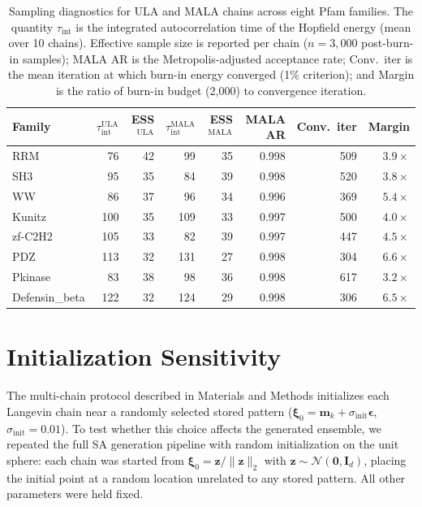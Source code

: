 \begin{table}[ht]
\centering
\caption{Sampling diagnostics for ULA and MALA chains across eight Pfam families. The quantity $\tau_{\mathrm{int}}$ is the integrated autocorrelation time of the Hopfield energy (mean over 10 chains). Effective sample size is reported per chain ($n{=}3{,}000$ post-burn-in samples); MALA AR is the Metropolis-adjusted acceptance rate; Conv.\ iter is the mean iteration at which burn-in energy converged (1\% criterion); and Margin is the ratio of burn-in budget (2{,}000) to convergence iteration.}
\label{tab:sampling-diag}
\small
\begin{tabular}{@{}lrrrrrrr@{}}
\toprule
Family & $\tau_{\mathrm{int}}^{\mathrm{ULA}}$ & ESS$^{\mathrm{ULA}}$ & $\tau_{\mathrm{int}}^{\mathrm{MALA}}$ & ESS$^{\mathrm{MALA}}$ & MALA AR & Conv.\ iter & Margin \\
\midrule
RRM            &  76 &  42 &  99 & 35 & 0.998 &  509 & $3.9\times$ \\
SH3            &  95 &  35 &  84 & 39 & 0.998 &  520 & $3.8\times$ \\
WW             &  86 &  37 &  96 & 34 & 0.996 &  369 & $5.4\times$ \\
Kunitz         & 100 &  35 & 109 & 33 & 0.997 &  500 & $4.0\times$ \\
zf-C2H2        & 105 &  33 &  82 & 39 & 0.997 &  447 & $4.5\times$ \\
PDZ            & 113 &  32 & 131 & 27 & 0.998 &  304 & $6.6\times$ \\
Pkinase        &  83 &  38 &  98 & 36 & 0.998 &  617 & $3.2\times$ \\
Defensin\_beta & 122 &  32 & 124 & 29 & 0.998 &  306 & $6.5\times$ \\
\bottomrule
\end{tabular}
\end{table}

\section{Initialization Sensitivity}\label{si:random-init}

The multi-chain protocol described in Materials and Methods initializes each Langevin chain near a randomly selected stored pattern ($\boldsymbol{\xi}_0 = \mathbf{m}_k + \sigma_{\mathrm{init}}\boldsymbol{\epsilon}$, $\sigma_{\mathrm{init}} = 0.01$). To test whether this choice affects the generated ensemble, we repeated the full SA generation pipeline with random initialization on the unit sphere: each chain was started from $\boldsymbol{\xi}_0 = \mathbf{z}/\|\mathbf{z}\|_2$ with $\mathbf{z} \sim \mathcal{N}(\mathbf{0}, \mathbf{I}_d)$, placing the initial point at a random location unrelated to any stored pattern. All other parameters were held fixed.

